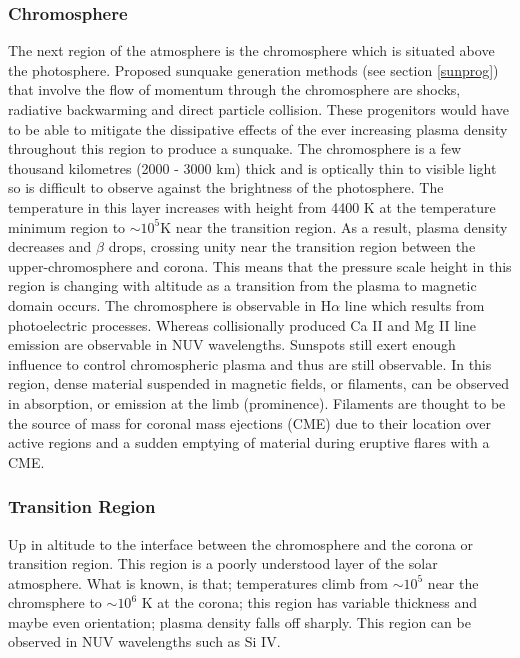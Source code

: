 \subsubsection{Chromosphere}
The next region of the atmosphere is the chromosphere which is situated above the photosphere. Proposed sunquake generation methods (see section \ref{sunprog}) that involve the flow of momentum through the chromosphere are shocks, radiative backwarming and direct particle collision. These progenitors would have to be able to mitigate the dissipative effects of the ever increasing plasma density throughout this region to produce a sunquake. The chromosphere is a few thousand kilometres (2000 - 3000 km) thick and is optically thin to visible light so is difficult to observe against the brightness of the photosphere. The temperature in this layer increases with height from 4400 K at the temperature minimum region to $\sim10^{5}$K near the transition region. As a result, plasma density decreases and $\beta$ drops, crossing unity near the transition region between the upper-chromosphere and corona. This means that the pressure scale height in this region is changing with altitude as a transition from the plasma to magnetic domain occurs. The chromosphere is observable in H$\alpha$ line which results from photoelectric processes. Whereas collisionally produced Ca II and Mg II line emission are observable in NUV wavelengths. Sunspots still exert enough influence to control chromospheric plasma and thus are still observable. In this region, dense material suspended in magnetic fields, or filaments, can be observed in absorption, or emission at the limb (prominence). Filaments are thought to be the source of mass for coronal mass ejections (CME) due to their location over active regions and a sudden emptying of material during eruptive flares with a CME. 

\subsubsection{Transition Region}
Up in altitude to the interface between the chromosphere and the corona or transition region. This region is a poorly understood layer of the solar atmosphere. What is known, is that; temperatures climb from $\sim10^{5}$ near the chromsphere to $\sim10^{6}$ K at the corona; this region has variable thickness and maybe even orientation; plasma density falls off sharply. This region can be observed in NUV wavelengths such as Si IV.  


